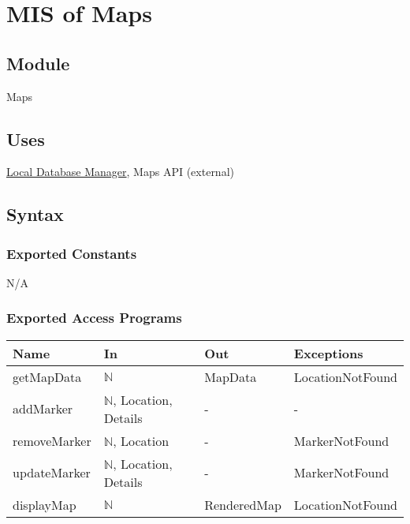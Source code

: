 \documentclass[12pt, titlepage]{article}
\begin{document}
\newpage


\section{MIS of Maps} \label{maps}

\subsection{Module}

Maps

\subsection{Uses}

\hyperref[local-dbm]{Local Database Manager}, Maps API (external)

\subsection{Syntax}

\subsubsection{Exported Constants}

N/A

\subsubsection{Exported Access Programs}

\begin{center}
  \begin{tabular}{p{4cm} p{3cm} p{3cm} p{4cm}}
    \hline
    \textbf{Name} & \textbf{In}                     & \textbf{Out} & \textbf{Exceptions} \\
    \hline
    getMapData    & $\mathbb{N}$                    & MapData      & LocationNotFound    \\
    addMarker     & $\mathbb{N}$, Location, Details & -            & -                   \\
    removeMarker  & $\mathbb{N}$, Location          & -            & MarkerNotFound      \\
    updateMarker  & $\mathbb{N}$, Location, Details & -            & MarkerNotFound      \\
    displayMap    & $\mathbb{N}$                    & RenderedMap  & LocationNotFound    \\
    \hline
  \end{tabular}
\end{center}
\end{document}
